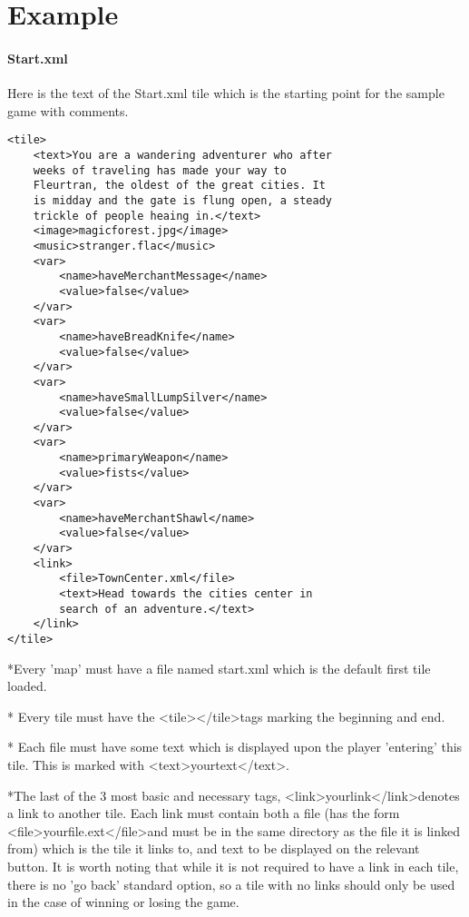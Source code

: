 \documentclass[11pt]{article}
\begin{document}
\section{Example}

\paragraph{Start.xml}

Here is the text of the Start.xml tile which is the starting point for the sample game with comments.

\begin{lstlisting}[frame=single]
<tile>
	<text>You are a wandering adventurer who after 
	weeks of traveling has made your way to 
	Fleurtran, the oldest of the great cities. It 
	is midday and the gate is flung open, a steady 
	trickle of people heaing in.</text>
	<image>magicforest.jpg</image>
	<music>stranger.flac</music>
	<var>
		<name>haveMerchantMessage</name>
		<value>false</value>
	</var>
	<var>
		<name>haveBreadKnife</name>
		<value>false</value>
	</var>
	<var>
		<name>haveSmallLumpSilver</name>
		<value>false</value>
	</var>
	<var>
		<name>primaryWeapon</name>
		<value>fists</value>
	</var>
	<var>
		<name>haveMerchantShawl</name>
		<value>false</value>
	</var>
	<link>
		<file>TownCenter.xml</file>
		<text>Head towards the cities center in 
		search of an adventure.</text>
	</link>
</tile>
\end{lstlisting}

*Every 'map' must have a file named start.xml which is the default first tile loaded.

* Every tile must have the \textless tile\textgreater \textless /tile\textgreater tags marking the beginning and end.

* Each file must have some text which is displayed upon the player 'entering' this tile. This is marked with \textless text\textgreater yourtext\textless /text\textgreater .

*The last of the 3 most basic and necessary tags, \textless link\textgreater yourlink\textless /link\textgreater  denotes a link to another tile. Each link must contain both a file (has the form \textless file\textgreater yourfile.ext\textless /file\textgreater and must be in the same directory as the file it is linked from) which is the tile it links to, and text to be displayed on the relevant button. It is worth noting that while it is not required to have a link in each tile, there is no 'go back' standard option, so a tile with no links should only be used in the case of winning or losing the game.
\end{document}
